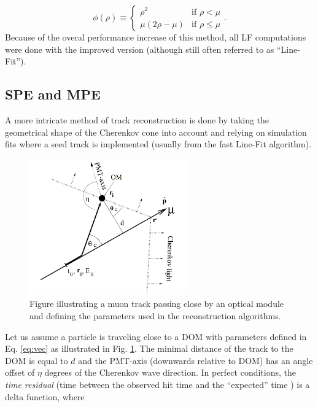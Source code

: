 \begin{equation}
\phi(\rho) \equiv \left\{
    \begin{array}{ll}
        \rho^2 &\textrm{if } \rho < \mu \\
        \mu\left(2\rho - \mu\right) & \textrm{if }\rho \leq \mu
    \end{array}
    \right.
    .
\end{equation}
\noindent Because of the overal performance increase of this method, all LF computations were done with the improved version (although still often referred to as ``Line-Fit'').

\subsection{SPE and MPE}
\label{subsec:spempe}
A more intricate method of track reconstruction is done by taking the geometrical shape of the Cherenkov cone into account and relying on simulation fits where a seed track is implemented (usually from the fast Line-Fit algorithm).


\begin{figure}
\centering
\includegraphics[width=0.6\textwidth]{chapter7/img/reconstruction.png}
\caption{Figure illustrating a muon track passing close by an optical module and defining the parameters used in the reconstruction algorithms.}
\label{fig:reconstruction}
\end{figure}

Let us assume a particle is traveling close to a DOM with parameters defined in Eq. \ref{eq:vec} as illustrated in Fig. \ref{fig:reconstruction}. The minimal distance of the track to the DOM is equal to $d$ and the PMT-axis (downwards relative to DOM) has an angle offset of $\eta$ degrees of the Cherenkov wave direction. In perfect conditions, the \textit{time residual} (time between the observed hit time and the ``expected'' time ) is a delta function, where

